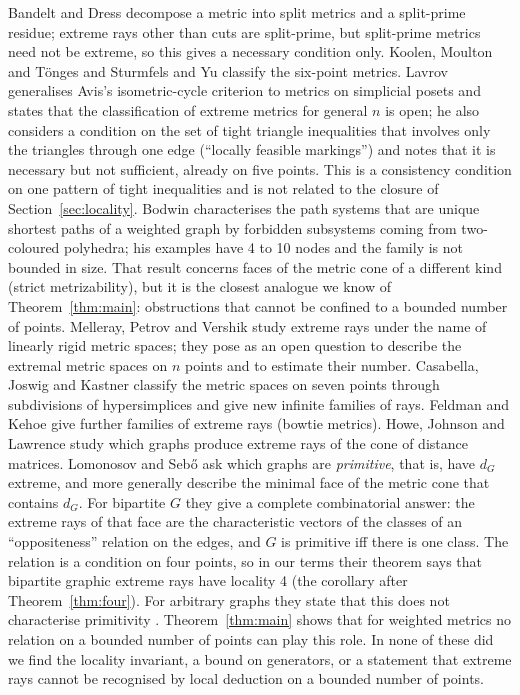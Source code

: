 \documentclass[11pt,a4paper]{article}
\theoremstyle{definition}
\theoremstyle{remark}
\begin{document}
Bandelt and Dress \cite{BD92} decompose a metric into split metrics and a split-prime residue; extreme rays other
than cuts are split-prime, but split-prime metrics need not be extreme, so this gives a necessary condition only.
Koolen, Moulton and T\"onges \cite{KMT00} and Sturmfels and Yu \cite{SY04} classify the six-point metrics. Lavrov
\cite{La25} generalises Avis's isometric-cycle criterion to metrics on simplicial posets and states that the
classification of extreme metrics for general $n$ is open; he also considers a condition on the set of tight
triangle inequalities that involves only the triangles through one edge (``locally feasible markings'') and notes
that it is necessary but not sufficient, already on five points. This is a consistency condition on one pattern of
tight inequalities and is not related to the closure of Section~\ref{sec:locality}. Bodwin \cite{Bo18} characterises the path systems that
are unique shortest paths of a weighted graph by forbidden subsystems coming from two-coloured polyhedra; his
examples have 4 to 10 nodes and the family is not bounded in size. That result concerns faces of the metric cone of
a different kind (strict metrizability), but it is the closest analogue we know of Theorem~\ref{thm:main}:
obstructions that cannot be confined to a bounded number of points. Melleray, Petrov and Vershik \cite{MPV08} study
extreme rays under the name of linearly rigid metric spaces; they pose as an open question to describe the extremal
metric spaces on $n$ points and to estimate their number. Casabella, Joswig and Kastner \cite{CJK24} classify the
metric spaces on seven points through subdivisions of hypersimplices and give new infinite families of rays.
Feldman and Kehoe \cite{FK26} give further families of extreme rays (bowtie metrics). Howe, Johnson and Lawrence
\cite{HJL86} study which graphs produce extreme rays of the cone of distance matrices. Lomonosov and Seb\H{o}
\cite{LS93} ask which graphs are \emph{primitive}, that is, have $d_G$ extreme, and more generally describe the
minimal face of the metric cone that contains $d_G$. For bipartite $G$ they give a complete combinatorial answer:
the extreme rays of that face are the characteristic vectors of the classes of an ``oppositeness'' relation on the
edges, and $G$ is primitive iff there is one class. The relation is a condition on four points, so in our terms
their theorem says that bipartite graphic extreme rays have locality 4 (the corollary after
Theorem~\ref{thm:four}). For arbitrary graphs they state that this does not characterise primitivity
\cite[p.~229]{LS93}. Theorem~\ref{thm:main} shows that for weighted metrics no relation on a bounded number of
points can play this role. In none of these did we find
the locality invariant, a bound on generators, or a statement that extreme rays cannot be recognised by local
deduction on a bounded number of points.
\end{document}

